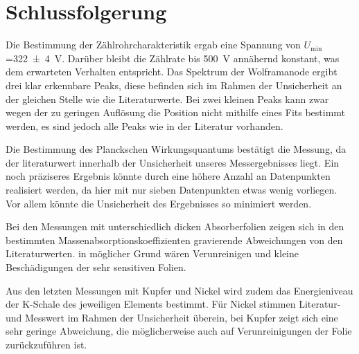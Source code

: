 \section{Schlussfolgerung}

Die Bestimmung der Zählrohrcharakteristik ergab eine Spannung von $U_{\mathrm{min}}$=\SI{322(4)}{V}. Darüber bleibt die Zählrate bis \SI{500}{V} annähernd konstant, was dem erwarteten Verhalten entspricht. 
Das Spektrum der Wolframanode ergibt drei klar erkennbare Peaks, diese befinden sich im Rahmen der Unsicherheit an der gleichen Stelle wie die Literaturwerte. Bei zwei kleinen Peaks kann zwar wegen der zu geringen Auflösung die Position nicht mithilfe eines Fits bestimmt werden, es sind jedoch alle Peaks wie in der Literatur vorhanden. 

Die Bestimmung des Planckschen Wirkungsquantums bestätigt die Messung, da der literaturwert innerhalb der Unsicherheit unseres Messergebnisses liegt. Ein noch präziseres Ergebnis könnte durch eine höhere Anzahl an Datenpunkten realisiert werden, da hier mit nur sieben Datenpunkten etwas wenig vorliegen. Vor allem könnte die Unsicherheit des Ergebnisses so minimiert werden. 

Bei den Messungen mit unterschiedlich dicken Absorberfolien zeigen sich in den bestimmten Massenabsorptionskoeffizienten gravierende Abweichungen von den Literaturwerten. in möglicher Grund wären Verunreinigen und kleine Beschädigungen der sehr sensitiven Folien. 

Aus den letzten Messungen mit Kupfer und Nickel wird zudem das Energieniveau der K-Schale des jeweiligen Elements bestimmt. Für Nickel stimmen Literatur- und Messwert im Rahmen der Unsicherheit überein, bei Kupfer zeigt sich eine sehr geringe Abweichung, die möglicherweise auch auf Verunreinigungen der Folie zurückzuführen ist. 